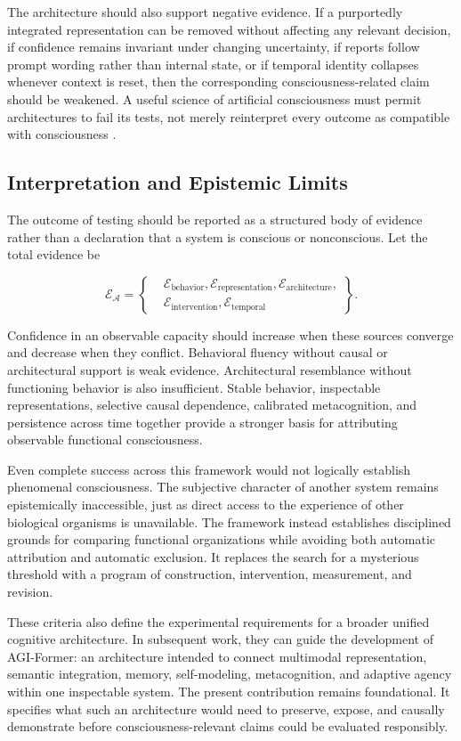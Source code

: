 The architecture should also support negative evidence. If a purportedly integrated representation can be removed without affecting any relevant decision, if confidence remains invariant under changing uncertainty, if reports follow prompt wording rather than internal state, or if temporal identity collapses whenever context is reset, then the corresponding consciousness-related claim should be weakened. A useful science of artificial consciousness must permit architectures to fail its tests, not merely reinterpret every outcome as compatible with consciousness \cite{doerig2021hard}.

\subsection{Interpretation and Epistemic Limits}

The outcome of testing should be reported as a structured body of evidence rather than a declaration that a system is conscious or nonconscious. Let the total evidence be

\begin{equation}
\mathcal{E}_{\mathcal{A}}
=
\left\{
\begin{aligned}
&\mathcal{E}_{\mathrm{behavior}},
\mathcal{E}_{\mathrm{representation}},
\mathcal{E}_{\mathrm{architecture}},\\
&\mathcal{E}_{\mathrm{intervention}},
\mathcal{E}_{\mathrm{temporal}}
\end{aligned}
\right\}.
\label{eq:convergent-evidence-set}
\end{equation}

Confidence in an observable capacity should increase when these sources converge and decrease when they conflict. Behavioral fluency without causal or architectural support is weak evidence. Architectural resemblance without functioning behavior is also insufficient. Stable behavior, inspectable representations, selective causal dependence, calibrated metacognition, and persistence across time together provide a stronger basis for attributing observable functional consciousness.

Even complete success across this framework would not logically establish phenomenal consciousness. The subjective character of another system remains epistemically inaccessible, just as direct access to the experience of other biological organisms is unavailable. The framework instead establishes disciplined grounds for comparing functional organizations while avoiding both automatic attribution and automatic exclusion. It replaces the search for a mysterious threshold with a program of construction, intervention, measurement, and revision.

These criteria also define the experimental requirements for a broader unified cognitive architecture. In subsequent work, they can guide the development of AGI-Former: an architecture intended to connect multimodal representation, semantic integration, memory, self-modeling, metacognition, and adaptive agency within one inspectable system. The present contribution remains foundational. It specifies what such an architecture would need to preserve, expose, and causally demonstrate before consciousness-relevant claims could be evaluated responsibly.
